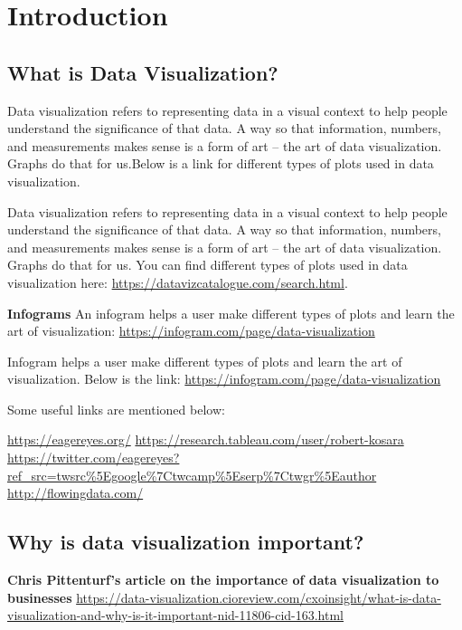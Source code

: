 \documentclass[]{book}
\theoremstyle{definition}
\theoremstyle{definition}
\theoremstyle{definition}
\theoremstyle{remark}
\begin{document}
\chapter{Introduction}\label{introduction}

\section{What is Data Visualization?}\label{what-is-data-visualization}

Data visualization refers to representing data in a visual context to
help people understand the significance of that data. A way so that
information, numbers, and measurements makes sense is a form of art --
the art of data visualization. Graphs do that for us.Below is a link for
different types of plots used in data visualization.

Data visualization refers to representing data in a visual context to
help people understand the significance of that data. A way so that
information, numbers, and measurements makes sense is a form of art --
the art of data visualization. Graphs do that for us. You can find
different types of plots used in data visualization here:
\url{https://datavizcatalogue.com/search.html}.

\textbf{Infograms} An infogram helps a user make different types of
plots and learn the art of visualization:
\url{https://infogram.com/page/data-visualization}

Infogram helps a user make different types of plots and learn the art of
visualization. Below is the link:
\url{https://infogram.com/page/data-visualization}

Some useful links are mentioned below:

\url{https://eagereyes.org/}
\url{https://research.tableau.com/user/robert-kosara}
\url{https://twitter.com/eagereyes?ref_src=twsrc\%5Egoogle\%7Ctwcamp\%5Eserp\%7Ctwgr\%5Eauthor}
\url{http://flowingdata.com/}

\section{Why is data visualization
important?}\label{why-is-data-visualization-important}

\textbf{Chris Pittenturf's article on the importance of data
visualization to businesses}
\url{https://data-visualization.cioreview.com/cxoinsight/what-is-data-visualization-and-why-is-it-important-nid-11806-cid-163.html}
\end{document}
